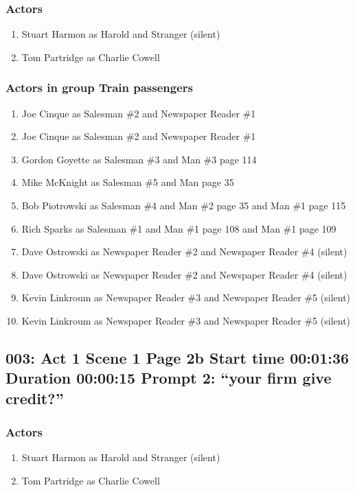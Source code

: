 \subsubsection{Actors}
\begin{enumerate}
\item Stuart Harmon as Harold and Stranger (silent)
\item Tom Partridge as Charlie Cowell
\end{enumerate}
\subsubsection{Actors in group Train passengers}
\begin{enumerate}
\item Joe Cinque as Salesman \#2 and Newspaper Reader \#1
\item Joe Cinque as Salesman \#2 and Newspaper Reader \#1
\item Gordon Goyette as Salesman \#3 and Man \#3 page 114
\item Mike McKnight as Salesman \#5 and Man page 35
\item Bob Piotrowski as Salesman \#4 and Man \#2 page 35 and Man \#1 page 115
\item Rich Sparks as Salesman \#1 and Man \#1 page 108 and Man \#1 page 109
\item Dave Ostrowski as Newspaper Reader \#2 and Newspaper Reader \#4 (silent)
\item Dave Ostrowski as Newspaper Reader \#2 and Newspaper Reader \#4 (silent)
\item Kevin Linkroum as Newspaper Reader \#3 and Newspaper Reader \#5 (silent)
\item Kevin Linkroum as Newspaper Reader \#3 and Newspaper Reader \#5 (silent)
\end{enumerate}


\subsection{003: Act 1 Scene 1 Page 2b Start time 00:01:36 Duration 00:00:15 Prompt 2: ``your firm give credit?''}

\subsubsection{Actors}
\begin{enumerate}
\item Stuart Harmon as Harold and Stranger (silent)
\item Tom Partridge as Charlie Cowell
\end{enumerate}
